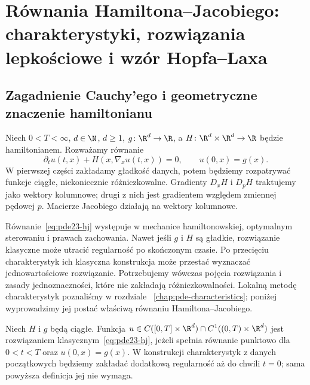 \chapter[Równania Hamiltona--Jacobiego]{Równania Hamiltona--Jacobiego: charakterystyki, rozwiązania lepkościowe i wzór Hopfa--Laxa}
\label{chap:pde23}

\section{Zagadnienie Cauchy'ego i geometryczne znaczenie hamiltonianu}
Niech $0<T<\infty$, $d\in\N$, $d\ge1$,
$g\colon\R^d\to\R$, a $H\colon\R^d\times\R^d\to\R$
będzie hamiltonianem. Rozważamy równanie
\begin{equation}\label{eq:pde23-hj}
 \partial_tu(t,x)+H(x,\nabla_xu(t,x))=0,
 \qquad u(0,x)=g(x).
\end{equation}
W pierwszej części zakładamy gładkość danych, potem będziemy
rozpatrywać funkcje ciągłe, niekoniecznie różniczkowalne.
Gradienty $D_xH$ i $D_pH$ traktujemy jako wektory kolumnowe;
drugi z nich jest gradientem względem zmiennej pędowej $p$.
Macierze Jacobiego działają na wektory kolumnowe.

Równanie~\eqref{eq:pde23-hj} występuje w mechanice
hamiltonowskiej, optymalnym sterowaniu i prawach zachowania.
Nawet jeśli $g$ i $H$ są gładkie, rozwiązanie klasyczne
może utracić regularność po skończonym czasie.
Po przecięciu charakterystyk ich klasyczna konstrukcja
może przestać wyznaczać jednowartościowe rozwiązanie.
Potrzebujemy wówczas pojęcia rozwiązania i zasady
jednoznaczności, które nie zakładają różniczkowalności.
Lokalną metodę charakterystyk poznaliśmy w rozdziale
~\ref{chap:pde-characteristics}; poniżej wyprowadzimy
jej postać właściwą równaniu Hamiltona--Jacobiego.

\begin{definicja}
Niech $H$ i $g$ będą ciągłe. Funkcja
$u\in C([0,T]\times\R^d)\cap C^1((0,T)\times\R^d)$
jest rozwiązaniem klasycznym~\eqref{eq:pde23-hj}, jeżeli
spełnia równanie punktowo dla $0<t<T$ oraz $u(0,x)=g(x)$.
W konstrukcji charakterystyk z danych początkowych
będziemy zakładać dodatkową regularność aż do chwili
$t=0$; sama powyższa definicja jej nie wymaga.
\end{definicja}

